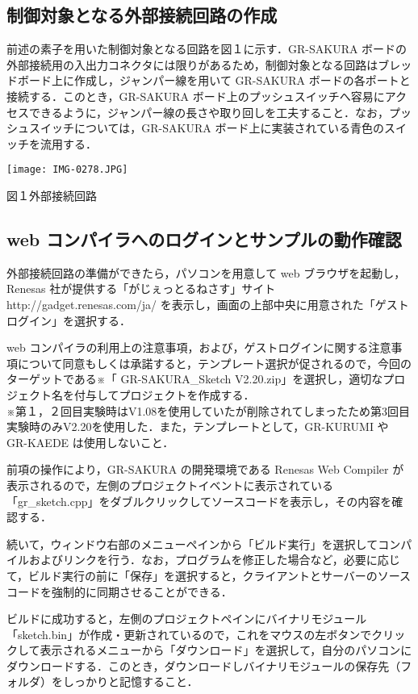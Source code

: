 \documentclass {ujarticle}
\begin{document}
 \subsection{制御対象となる外部接続回路の作成}
 前述の素子を用いた制御対象となる回路を図１に示す．GR-SAKURA ボードの外部接続用の入出力コネクタには限りがあるため，制御対象となる回路はブレッドボード上に作成し，ジャンパー線を用いて GR-SAKURA ボードの各ポートと接続する．このとき，GR-SAKURA ボード上のプッシュスイッチへ容易にアクセスできるように，ジャンパー線の長さや取り回しを工夫すること．なお，プッシュスイッチについては，GR-SAKURA ボード上に実装されている青色のスイッチを流用する．
 \begin{center}
 \texttt{[image: IMG-0278.JPG]}
 
 図１外部接続回路
 \end{center}
 \subsection{web コンパイラへのログインとサンプルの動作確認}
 外部接続回路の準備ができたら，パソコンを用意して web ブラウザを起動し，Renesas 社が提供する「がじぇっとるねさす」サイト http://gadget.renesas.com/ja/ を表示し，画面の上部中央に用意された「ゲストログイン」を選択する．　
 
 web コンパイラの利用上の注意事項，および，ゲストログインに関する注意事項について同意もしくは承諾すると，テンプレート選択が促されるので，今回のターゲットである※「 GR-SAKURA\_Sketch V2.20.zip」を選択し，適切なプロジェクト名を付与してプロジェクトを作成する．\\※第１，２回目実験時はV1.08を使用していたが削除されてしまったため第3回目実験時のみV2.20を使用した．また，テンプレートとして，GR-KURUMI や GR-KAEDE は使用しないこと．
 
 前項の操作により，GR-SAKURA の開発環境である Renesas Web Compiler が表示されるので，左側のプロジェクトイベントに表示されている「gr\_sketch.cpp」をダブルクリックしてソースコードを表示し，その内容を確認する．
 
 続いて，ウィンドウ右部のメニューペインから「ビルド実行」を選択してコンパイルおよびリンクを行う．なお，プログラムを修正した場合など，必要に応じて，ビルド実行の前に「保存」を選択すると，クライアントとサーバーのソースコードを強制的に同期させることができる．
 
 ビルドに成功すると，左側のプロジェクトペインにバイナリモジュール「sketch.bin」が作成・更新されているので，これをマウスの左ボタンでクリックして表示されるメニューから「ダウンロード」を選択して，自分のパソコンにダウンロードする．このとき，ダウンロードしバイナリモジュールの保存先（フォルダ）をしっかりと記憶すること．
 
\end{document}
